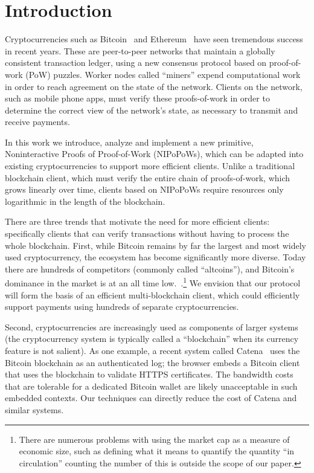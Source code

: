 \section{Introduction}
Cryptocurrencies such as Bitcoin~\cite{bitcoin} and Ethereum~\cite{ethereum} have seen tremendous success in recent years.
These are peer-to-peer networks that maintain a globally consistent transaction ledger, using a new consensus protocol based on proof-of-work (PoW) puzzles. Worker nodes called ``miners'' expend computational work in order to reach agreement on the state of the network.
Clients on the network, such as mobile phone apps, must verify these proofs-of-work in order to determine the correct view of the network's state, as necessary to transmit and receive payments.

In this work we introduce, analyze and implement a new primitive,
Noninteractive Proofs of Proof-of-Work (NIPoPoWs), which can be adapted into existing cryptocurrencies to support more efficient clients.
Unlike a traditional blockchain client, which must verify the entire chain of proofs-of-work, which grows linearly over time, clients based on NIPoPoWs require resources only logarithmic in the length of the blockchain.

There are three trends that motivate the need for more efficient clients: specifically clients that can verify transactions without having to process the whole blockchain.
First, while Bitcoin remains by far the largest and most widely used cryptocurrency, the ecosystem has become significantly more diverse. Today there are hundreds of competitors (commonly called ``altcoins''), and Bitcoin's dominance in the market is at an all time low.~\cite{marketcap}.\footnote{There are numerous problems with using the market cap as a measure of economic size, such as defining what it means to quantify the quantity ``in circulation'' counting the number of this is outside the scope of our paper.}
  We envision that our protocol will form the basis of an efficient multi-blockchain client, which could efficiently support payments using hundreds of separate cryptocurrencies.

  Second, cryptocurrencies are increasingly used as components of larger systems (the cryptocurrency system is typically called a ``blockchain'' when its currency feature is not salient).
  As one example, a recent system called Catena~\cite{catena} uses the Bitcoin blockchain as an authenticated log; the browser embeds a Bitcoin client that uses the blockchain to validate HTTPS certificates.
  The bandwidth costs that are tolerable for a dedicated Bitcoin wallet are likely unacceptable in such embedded contexts. Our techniques can directly reduce the cost of Catena and similar systems.


